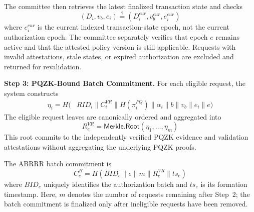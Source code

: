 \documentclass[lettersize,journal]{IEEEtran}
\begin{document}
The committee then retrieves the latest finalized
transaction state and checks
\begin{equation}
(D_i,v_b,e_i)
\stackrel{?}{=}
(D_i^{cur},v_b^{cur},e_i^{cur})
\end{equation}
where $e_i^{cur}$ is the current indexed
transaction-state epoch, not the current
authorization epoch. The committee separately
verifies that epoch $e$ remains active and that
the attested policy version is still applicable.
Requests with invalid attestations, stale states,
or expired authorization are excluded and
returned for revalidation.

\medskip
\noindent\textbf{Step 3: PQZK-Bound Batch Commitment.}
For each eligible request, the system constructs
\begin{equation}
\begin{aligned}
\eta_i=H\big(&RID_i\parallel C_i^{VR}
\parallel H(\pi_i^{PQ})\parallel\alpha_i\parallel b
\parallel v_b\parallel e_i\parallel e\big)
\end{aligned}
\end{equation}
The eligible request leaves are canonically
ordered and aggregated into
\begin{equation}
R_e^{VR}=
\mathsf{Merkle.Root}
(\eta_1,\ldots,\eta_m)
\end{equation}
This root commits to the independently verified
PQZK evidence and validation attestations
without aggregating the underlying PQZK proofs.

The ABRRR batch commitment is
\begin{equation}
C_e^{B}=
H(BID_e\parallel e\parallel m
\parallel R_e^{VR}\parallel ts_e)
\end{equation}
where $BID_e$ uniquely identifies the
authorization batch and $ts_e$ is its
formation timestamp. Here, $m$ denotes the
number of requests remaining after Step~2;
the batch commitment is finalized only after
ineligible requests have been removed.
\end{document}
